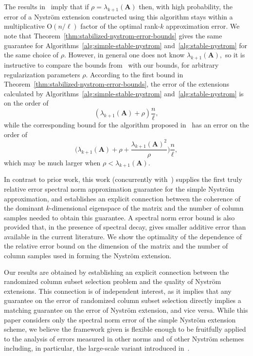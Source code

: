 \documentclass[11pt,letterpaper,twoside,reqno,nosumlimits]{amsart}
\newcommand{\mat}[1]{\ensuremath{\mathbf{#1}}}
\theoremstyle{remark}
\begin{document}
The results in~\cite{CD11} imply that if $\rho = \lambda_{k+1}(\mat{A})$ then, with high probability, the error of a Nystr\"om extension constructed using this algorithm stays within a multiplicative $\mathrm{O}(n/\ell)$ factor of the optimal rank-$k$ approximation error. We note that Theorem~\ref{thm:stabilized-nystrom-error-bounds} gives the same guarantee for Algorithms~\ref{alg:simple-stable-nystrom} and~\ref{alg:stable-nystrom} for the same choice of $\rho.$ However, in general one does not know $\lambda_{k+1}(\mat{A}),$ so it is instructive to compare the bounds from~\cite{CD11} with our bounds, for arbitrary regularization parameters $\rho.$ According to the first bound in Theorem~\ref{thm:stabilized-nystrom-error-bounds}, the error of the extensions 
calculated by Algorithms~\ref{alg:simple-stable-nystrom} and~\ref{alg:stable-nystrom} is on the order of
\[
 (\lambda_{k+1}(\mat{A}) + \rho)\frac{n}{\ell},
\]
while the corresponding bound for the algorithm proposed in~\cite{CD11} has an error on the order of
\[
 \bigg(\lambda_{k+1}(\mat{A}) + \rho + \frac{\lambda_{k+1}(\mat{A})^2}{\rho}\bigg)\frac{n}{\ell},
\]
which may be much larger when $\rho < \lambda_{k+1}(\mat{A}).$

In contrast to prior work, this work (concurrently with~\cite{CD11}) supplies the first truly relative error spectral norm approximation guarantee for the simple Nystr\"om approximation, and establishes an explicit connection between the coherence of the dominant $k$-dimensional eigenspace of the matrix and the number of column samples needed to obtain this guarantee. A spectral norm error bound is also provided that, in the presence of spectral decay, gives smaller additive error than available in the current literature. We show the optimality of the dependence of the relative error bound on the dimension of the matrix and the number of column samples used in forming the Nystr\"om extension.

Our results are obtained by establishing an explicit connection between the randomized column subset selection problem and the quality of Nystr\"om extensions.  This connection is of independent interest, as it implies that any guarantee on the error of randomized column subset selection directly implies a matching guarantee on the error of Nystr\"om extension, and vice versa. While this paper considers only the spectral norm error of the simple Nystr\"om extension scheme, we believe the framework given is flexible enough to be fruitfully applied to the analysis of errors measured in other norms and of other Nystr\"om schemes including, in particular, the large-scale variant introduced in~\cite{KLL10}.
\end{document}

